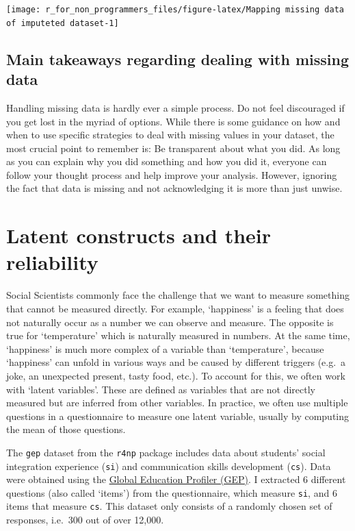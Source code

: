\documentclass[
]{book}
\begin{document}
\begin{center}\texttt{[image: r\_for\_non\_programmers\_files/figure-latex/Mapping missing data of imputeted dataset-1]} \end{center}

\hypertarget{main-takeaways-regarding-dealing-with-missing-data}{%
\subsection{Main takeaways regarding dealing with missing data}\label{main-takeaways-regarding-dealing-with-missing-data}}

Handling missing data is hardly ever a simple process. Do not feel discouraged if you get lost in the myriad of options. While there is some guidance on how and when to use specific strategies to deal with missing values in your dataset, the most crucial point to remember is: Be transparent about what you did. As long as you can explain why you did something and how you did it, everyone can follow your thought process and help improve your analysis. However, ignoring the fact that data is missing and not acknowledging it is more than just unwise.

\hypertarget{latent-constructs}{%
\section{Latent constructs and their reliability}\label{latent-constructs}}

Social Scientists commonly face the challenge that we want to measure something that cannot be measured directly. For example, `happiness' is a feeling that does not naturally occur as a number we can observe and measure. The opposite is true for `temperature' which is naturally measured in numbers. At the same time, `happiness' is much more complex of a variable than `temperature', because `happiness' can unfold in various ways and be caused by different triggers (e.g.~a joke, an unexpected present, tasty food, etc.). To account for this, we often work with `latent variables'. These are defined as variables that are not directly measured but are inferred from other variables. In practice, we often use multiple questions in a questionnaire to measure one latent variable, usually by computing the mean of those questions.

The \texttt{gep} dataset from the \texttt{r4np} package includes data about students' social integration experience (\texttt{si}) and communication skills development (\texttt{cs}). Data were obtained using the \href{https://warwick.ac.uk/gep}{Global Education Profiler (GEP)}. I extracted 6 different questions (also called `items') from the questionnaire, which measure \texttt{si}, and 6 items that measure \texttt{cs}. This dataset only consists of a randomly chosen set of responses, i.e.~300 out of over 12,000.
\end{document}
